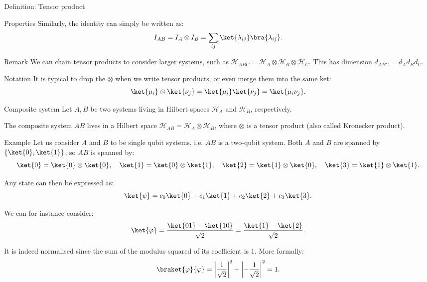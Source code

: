 \documentclass[a4paper]{article}
\begin{document}
\begin{parag}{Definition: Tensor product}
\begin{subparag}{Properties}
        Similarly, the identity can simply be written as: 
        \[I_{AB} = I_A \otimes I_B = \sum_{ij} \ket{\lambda_{ij}}\bra{\lambda_{ij}}.\]
    \end{subparag}

    \begin{subparag}{Remark}
        We can chain tensor products to consider larger systems, such as $\mathcal{H}_{ABC} = \mathcal{H}_A \otimes \mathcal{H}_B \otimes \mathcal{H}_C$. This has dimension $d_{ABC} = d_A d_B d_C$.
    \end{subparag}
    

    \begin{subparag}{Notation}
        It is typical to drop the $\otimes$ when we write tensor products, or even merge them into the same ket: 
        \[\ket{\mu_i} \otimes \ket{\nu_j} = \ket{\mu_i} \ket{\nu_j} = \ket{\mu_i \nu_j}.\]
    \end{subparag}
\end{parag}


\begin{parag}{Composite system}
    Let $A, B$ be two systems living in Hilbert spaces $\mathcal{H}_A$ and $\mathcal{H}_B$, respectively.

    The composite system $AB$ lives in a Hilbert space $\mathcal{H}_{AB} = \mathcal{H}_A \otimes \mathcal{H}_B$, where $\otimes$ is a tensor product (also called Kronecker product).

    \begin{subparag}{Example}
        Let us consider $A$ and $B$ to be single qubit systems, i.e. $AB$ is a two-qubit system. Both $A$ and $B$ are spanned by $\left\{\ket{0}, \ket{1}\right\}$, so $AB$ is spanned by: 
        \[\ket{0} = \ket{0}\otimes \ket{0}, \mathspace \ket{1} = \ket{0}\otimes \ket{1}, \mathspace \ket{2} = \ket{1} \otimes \ket{0}, \mathspace \ket{3} = \ket{1} \otimes \ket{1}.\]

        Any state can then be expressed as: 
        \[\ket{\psi} = c_0 \ket{0} + c_1 \ket{1} + c_2 \ket{2} + c_3 \ket{3}.\]

        We can for instance consider: 
        \[\ket{\phi} = \frac{\ket{01} - \ket{10}}{\sqrt{2}} = \frac{\ket{1} - \ket{2}}{\sqrt{2}}.\]

        It is indeed normalised since the sum of the modulus squared of its coefficient is 1. More formally: 
        \[\braket{\phi}{\phi} = \left|\frac{1}{\sqrt{2}}\right|^2 + \left|-\frac{1}{\sqrt{2}}\right|^2 = 1.\]
    \end{subparag}
\end{parag}
\end{document}
